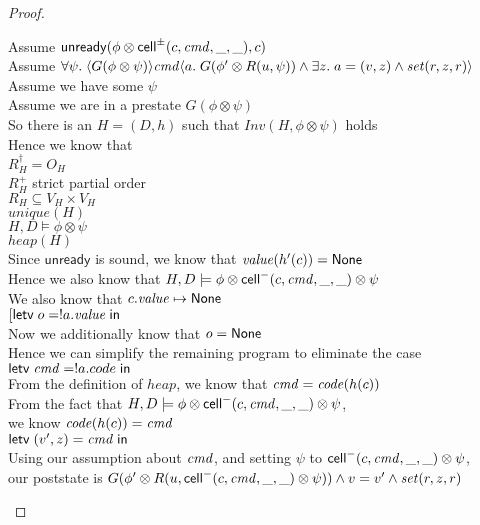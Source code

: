 \begin{proof}
\begin{tabbedproof}
\oo Assume $\mathsf{unready}({\phi \otimes \mathsf{cell}^{\pm}({c}, {\mathit{cmd}}, {\_}, {\_})}, {c})$ \\
\oo Assume $\forall \psi.\; 
       \langle{G(\phi \otimes \psi)}\rangle{\mathit{cmd}}\langle{a}.\;{G(\phi' \otimes R(u, \psi)) \land \exists z.\; a = (v, z) \land \mathit{set}(r, z, r)}\rangle $ \\
\oo Assume we have some $\psi$ \\
\ooo Assume we are in a prestate $G(\phi \otimes \psi)$ \\
\ooo So there is an $H = (D,h)$ such that $\mathit{Inv}(H, \phi \otimes \psi)$ holds \\
\ooo Hence we know that \\
\ooox $R^\dagger_H = O_H$ \\
\ooox $R^+_H$ strict partial order \\
\ooox $R_H \subseteq V_H \times V_H$ \\
\ooox $\mathit{unique}(H)$ \\
\ooox $H, D \models \phi \otimes \psi$ \\
\ooox $\mathit{heap}(H)$ \\
\ooo Since $\mathsf{unready}$ is sound, we know that $\mathit{value}(h'(c)) = \mathsf{None}$ \\
\ooo Hence we also know that $H, D \models \phi \otimes \mathsf{cell}^{-}({c}, {\mathit{cmd}}, {\_}, {\_}) \otimes \psi$ \\
\ooo We also know that $c.\mathit{value} \mapsto \mathsf{None}$ \\
\ooo $[\mathsf{letv}\;o = !a.\mathit{value}\;\mathsf{in}\;$ \\
\ooo Now we additionally know that $o = \mathsf{None}$ \\
\ooo Hence we can simplify the remaining program to eliminate the case \\
\ooo $\mathsf{letv}\;\mathit{cmd} = !a.code\;\mathsf{in}\;$ \\
\ooo From the definition of $\mathit{heap}$, we know that $\mathit{cmd} = \mathit{code}(h(c))$ \\
\ooo From the fact that $H, D \models \phi \otimes \mathsf{cell}^{-}({c}, {\mathit{cmd}}, {\_}, {\_}) \otimes \psi$, \\
\oox we know $\mathit{code}(h(c)) = \mathit{cmd}$ \\
\ooo $\mathsf{letv}\;(v',z) = \mathit{cmd}\;\mathsf{in}\;$ \\
\ooo Using our assumption about $\mathit{cmd}$, and setting $\psi$ to $\mathsf{cell}^{-}({c}, {\mathit{cmd}}, {\_}, {\_}) \otimes \psi$, \\
\ooo our poststate is $G(\phi' \otimes R(u, \mathsf{cell}^{-}({c}, {\mathit{cmd}}, {\_}, {\_}) \otimes \psi)) \land v = v' \land \mathit{set}(r, z, r)$ \\

\end{tabbedproof}
\end{proof}
